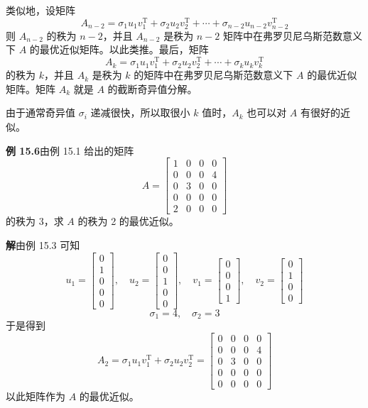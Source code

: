 \documentclass[UTF8,12pt,a4paper,fontset=fandol]{ctexart}
\begin{document}
类似地，设矩阵
\[
A_{n-2}=\sigma_1u_1v_1^{\mathrm{T}}+\sigma_2u_2v_2^{\mathrm{T}}+\cdots+\sigma_{n-2}u_{n-2}v_{n-2}^{\mathrm{T}}
\]
则 $A_{n-2}$ 的秩为 $n-2$，并且 $A_{n-2}$ 是秩为 $n-2$ 矩阵中在弗罗贝尼乌斯范数意义下 $A$ 的最优近似矩阵。以此类推。最后，矩阵
\[
A_k=\sigma_1u_1v_1^{\mathrm{T}}+\sigma_2u_2v_2^{\mathrm{T}}+\cdots+\sigma_ku_kv_k^{\mathrm{T}}
\]
的秩为 $k$，并且 $A_k$ 是秩为 $k$ 的矩阵中在弗罗贝尼乌斯范数意义下 $A$ 的最优近似矩阵。矩阵 $A_k$ 就是 $A$ 的截断奇异值分解。

由于通常奇异值 $\sigma_i$ 递减很快，所以取很小 $k$ 值时，$A_k$ 也可以对 $A$ 有很好的近似。

\noindent\textbf{例 15.6}\quad 由例 15.1 给出的矩阵
\[
A=
\begin{bmatrix}
1&0&0&0\\
0&0&0&4\\
0&3&0&0\\
0&0&0&0\\
2&0&0&0
\end{bmatrix}
\]
的秩为 3，求 $A$ 的秩为 2 的最优近似。

\noindent\textbf{解}\quad 由例 15.3 可知
\[
u_1=
\begin{bmatrix}
0\\1\\0\\0\\0
\end{bmatrix},\quad
u_2=
\begin{bmatrix}
0\\0\\1\\0\\0
\end{bmatrix},\quad
v_1=
\begin{bmatrix}
0\\0\\0\\1
\end{bmatrix},\quad
v_2=
\begin{bmatrix}
0\\1\\0\\0
\end{bmatrix}
\]
\[
\sigma_1=4,\quad\sigma_2=3
\]
于是得到
\[
A_2=\sigma_1u_1v_1^{\mathrm{T}}+\sigma_2u_2v_2^{\mathrm{T}}
=
\begin{bmatrix}
0&0&0&0\\
0&0&0&4\\
0&3&0&0\\
0&0&0&0\\
0&0&0&0
\end{bmatrix}
\]
以此矩阵作为 $A$ 的最优近似。
\end{document}
